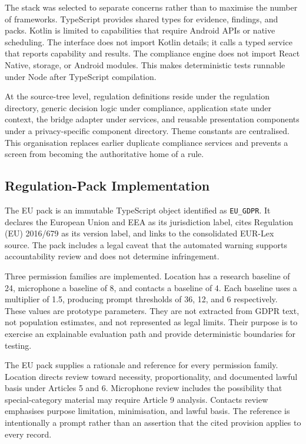The stack was selected to separate concerns rather than to maximise the number of frameworks. TypeScript provides shared types for evidence, findings, and packs. Kotlin is limited to capabilities that require Android APIs or native scheduling. The interface does not import Kotlin details; it calls a typed service that reports capability and results. The compliance engine does not import React Native, storage, or Android modules. This makes deterministic tests runnable under Node after TypeScript compilation.

At the source-tree level, regulation definitions reside under the regulation directory, generic decision logic under compliance, application state under context, the bridge adapter under services, and reusable presentation components under a privacy-specific component directory. Theme constants are centralised. This organisation replaces earlier duplicate compliance services and prevents a screen from becoming the authoritative home of a rule.

\subsection{Regulation-Pack Implementation}

The EU pack is an immutable TypeScript object identified as \texttt{EU\_GDPR}. It declares the European Union and EEA as its jurisdiction label, cites Regulation (EU) 2016/679 as its version label, and links to the consolidated EUR-Lex source. The pack includes a legal caveat that the automated warning supports accountability review and does not determine infringement.

Three permission families are implemented. Location has a research baseline of 24, microphone a baseline of 8, and contacts a baseline of 4. Each baseline uses a multiplier of 1.5, producing prompt thresholds of 36, 12, and 6 respectively. These values are prototype parameters. They are not extracted from GDPR text, not population estimates, and not represented as legal limits. Their purpose is to exercise an explainable evaluation path and provide deterministic boundaries for testing.

The EU pack supplies a rationale and reference for every permission family. Location directs review toward necessity, proportionality, and documented lawful basis under Articles 5 and 6. Microphone review includes the possibility that special-category material may require Article 9 analysis. Contacts review emphasises purpose limitation, minimisation, and lawful basis. The reference is intentionally a prompt rather than an assertion that the cited provision applies to every record.

